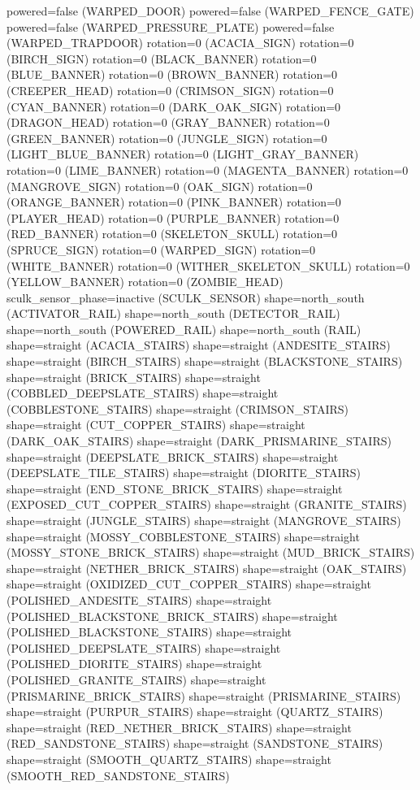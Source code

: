 \documentclass[11pt]{article}
\begin{document}
powered=false (WARPED_DOOR)
powered=false (WARPED_FENCE_GATE)
powered=false (WARPED_PRESSURE_PLATE)
powered=false (WARPED_TRAPDOOR)
rotation=0 (ACACIA_SIGN)
rotation=0 (BIRCH_SIGN)
rotation=0 (BLACK_BANNER)
rotation=0 (BLUE_BANNER)
rotation=0 (BROWN_BANNER)
rotation=0 (CREEPER_HEAD)
rotation=0 (CRIMSON_SIGN)
rotation=0 (CYAN_BANNER)
rotation=0 (DARK_OAK_SIGN)
rotation=0 (DRAGON_HEAD)
rotation=0 (GRAY_BANNER)
rotation=0 (GREEN_BANNER)
rotation=0 (JUNGLE_SIGN)
rotation=0 (LIGHT_BLUE_BANNER)
rotation=0 (LIGHT_GRAY_BANNER)
rotation=0 (LIME_BANNER)
rotation=0 (MAGENTA_BANNER)
rotation=0 (MANGROVE_SIGN)
rotation=0 (OAK_SIGN)
rotation=0 (ORANGE_BANNER)
rotation=0 (PINK_BANNER)
rotation=0 (PLAYER_HEAD)
rotation=0 (PURPLE_BANNER)
rotation=0 (RED_BANNER)
rotation=0 (SKELETON_SKULL)
rotation=0 (SPRUCE_SIGN)
rotation=0 (WARPED_SIGN)
rotation=0 (WHITE_BANNER)
rotation=0 (WITHER_SKELETON_SKULL)
rotation=0 (YELLOW_BANNER)
rotation=0 (ZOMBIE_HEAD)
sculk_sensor_phase=inactive (SCULK_SENSOR)
shape=north_south (ACTIVATOR_RAIL)
shape=north_south (DETECTOR_RAIL)
shape=north_south (POWERED_RAIL)
shape=north_south (RAIL)
shape=straight (ACACIA_STAIRS)
shape=straight (ANDESITE_STAIRS)
shape=straight (BIRCH_STAIRS)
shape=straight (BLACKSTONE_STAIRS)
shape=straight (BRICK_STAIRS)
shape=straight (COBBLED_DEEPSLATE_STAIRS)
shape=straight (COBBLESTONE_STAIRS)
shape=straight (CRIMSON_STAIRS)
shape=straight (CUT_COPPER_STAIRS)
shape=straight (DARK_OAK_STAIRS)
shape=straight (DARK_PRISMARINE_STAIRS)
shape=straight (DEEPSLATE_BRICK_STAIRS)
shape=straight (DEEPSLATE_TILE_STAIRS)
shape=straight (DIORITE_STAIRS)
shape=straight (END_STONE_BRICK_STAIRS)
shape=straight (EXPOSED_CUT_COPPER_STAIRS)
shape=straight (GRANITE_STAIRS)
shape=straight (JUNGLE_STAIRS)
shape=straight (MANGROVE_STAIRS)
shape=straight (MOSSY_COBBLESTONE_STAIRS)
shape=straight (MOSSY_STONE_BRICK_STAIRS)
shape=straight (MUD_BRICK_STAIRS)
shape=straight (NETHER_BRICK_STAIRS)
shape=straight (OAK_STAIRS)
shape=straight (OXIDIZED_CUT_COPPER_STAIRS)
shape=straight (POLISHED_ANDESITE_STAIRS)
shape=straight (POLISHED_BLACKSTONE_BRICK_STAIRS)
shape=straight (POLISHED_BLACKSTONE_STAIRS)
shape=straight (POLISHED_DEEPSLATE_STAIRS)
shape=straight (POLISHED_DIORITE_STAIRS)
shape=straight (POLISHED_GRANITE_STAIRS)
shape=straight (PRISMARINE_BRICK_STAIRS)
shape=straight (PRISMARINE_STAIRS)
shape=straight (PURPUR_STAIRS)
shape=straight (QUARTZ_STAIRS)
shape=straight (RED_NETHER_BRICK_STAIRS)
shape=straight (RED_SANDSTONE_STAIRS)
shape=straight (SANDSTONE_STAIRS)
shape=straight (SMOOTH_QUARTZ_STAIRS)
shape=straight (SMOOTH_RED_SANDSTONE_STAIRS)
\end{document}
